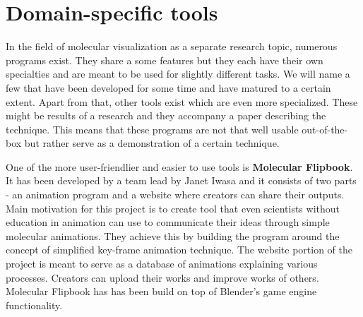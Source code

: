 \documentclass[
  digital, %
  table,   %
  nolof,     %
  nolot,     %
]{fithesis3}
\begin{document}


\section{Domain-specific tools}
In the field of molecular visualization as a separate research topic, numerous programs exist. They share a some features but they each have their own specialties and are meant to be used for slightly different tasks. We will name a few that have been developed for some time and have matured to a certain extent. Apart from that, other tools exist which are even more specialized. These might be results of a research and they accompany a paper describing the technique. This means that these programs are not that well usable out-of-the-box but rather serve as a demonstration of a certain technique.

One of the more user-friendlier and easier to use tools is \textbf{Molecular Flipbook}. It has been developed by a team lead by Janet Iwasa and it consists of two parts - an animation program and a website where creators can share their outputs. Main motivation for this project is to create tool that even scientists without education in animation can use to communicate their ideas through simple molecular animations. They achieve this by building the program around the concept of simplified key-frame animation technique. The website portion of the project is meant to serve as a database of animations explaining various processes. Creators can upload their works and improve works of others. Molecular Flipbook has has been build on top of Blender's game engine functionality.
\end{document}

